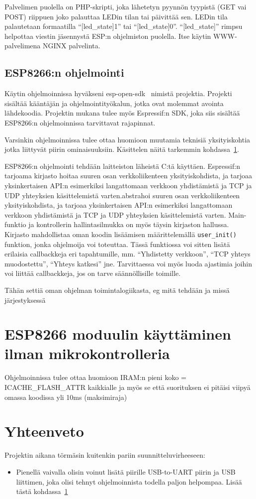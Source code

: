 Palvelimen puolella on PHP-skripti, joka lähetetyn pyynnön tyypistä (GET vai
POST) riippuen joko palauttaa LEDin tilan tai päivittää sen. LEDin tila
palautetaan formaatilla ``[led\_state]1'' tai ``[led\_state]0''.
``[led\_state]'' rimpsu helpottaa viestin jäsennystä ESP:n ohjelmiston
puolella. Itse käytin WWW-palvelimena NGINX palvelinta.

\subsection{ESP8266:n ohjelmointi}
Käytin ohjelmoinnissa hyväkseni esp-open-sdk~\cite{esp-open-sdk} nimistä
projektia. Projekti sisältää kääntäjän ja ohjelmointityökalun, jotka ovat
molemmat avointa lähdekoodia. Projektin mukana tulee myös Espressif:n SDK, joka
siis sisältää ESP8266:n ohjelmoinnissa tarvittavat rajapinnat.

Varsinkin ohjelmoinnissa tulee ottaa huomioon muutamia teknisiä yksityiskohtia
jotka liittyvät piirin ominaisuuksiin. Käsittelen näitä tarkemmin
kohdassa~\ref{sec:extra}.

ESP8266:n ohjelmointi tehdään laitteiston läheistä C:tä käyttäen. Espressif:n
tarjoama kirjasto hoitaa suuren osan verkkoliikenteen yksityiskohdista, ja
tarjoaa yksinkertaisen API:n esimerkiksi langattomaan verkkoon yhdistämistä ja
TCP ja UDP yhteyksien käsittelemistä varten.abstrahoi suuren osan
verkkoliikenteen yksityiskohdista, ja tarjoaa yksinkertaisen API:n esimerkiksi
langattomaan verkkoon yhdistämistä ja TCP ja UDP yhteyksien käsittelemistä
varten. Main-funktio ja kontrollerin hallintasilmukka on myös täysin kirjaston
hallussa. Kirjasto mahdollistaa oman koodin lisäämisen määrittelemällä
\texttt{user\_init()} funktion, jonka ohjelmoija voi toteuttaa.  Tässä
funktiossa voi sitten lisätä erilaisia callbackkeja eri tapahtumille, mm.
``Yhdistetty verkkoon'', ``TCP yhteys muodostettu'', ``Yhteys katkesi'' jne.
Tarvittaessa voi myös luoda ajastimia joihin voi liittää callbackkeja, jos on
tarve säännöllisille toimille.

Tähän settiä oman ohjelman toimintalogiikasta, eg mitä tehdään ja missä
järjestyksessä

\section{ESP8266 moduulin käyttäminen ilman mikrokontrolleria}
\label{sec:extra}

Ohjelmoinnissa tulee ottaa huomioon IRAM:n pieni koko = ICACHE\_FLASH\_ATTR
kaikkialle ja myös se että suorituksen ei pitäisi viipyä omassa koodissa yli
10ms (maksimiraja)

\section{Yhteenveto}

Projektin aikana törmäsin kuitenkin pariin suunnitteluvirheeseen:
\begin{itemize}
  \item Pienellä vaivalla olisin voinut lisätä piirille USB-to-UART piirin ja
    USB liittimen, joka olisi tehnyt ohjelmoinnista todella paljon helpompaa.
    Lisää tästä kohdassa~\ref{sec:extra}
\end{itemize}
